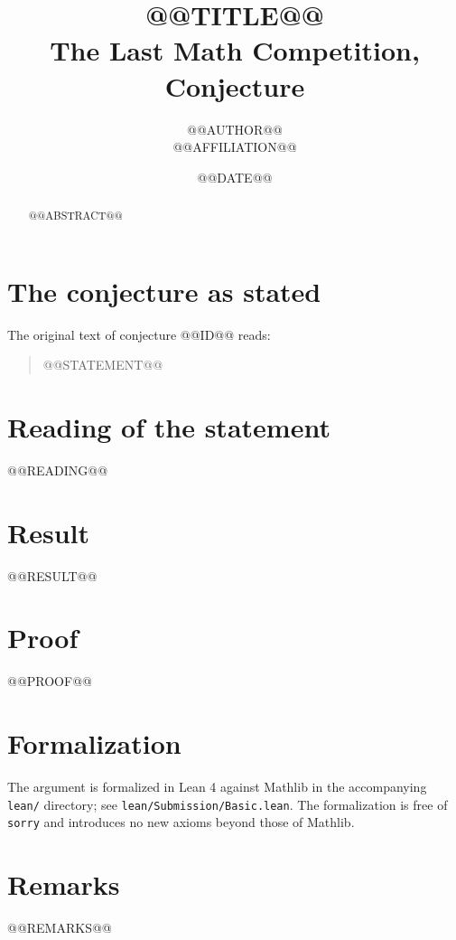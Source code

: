 \documentclass[11pt]{article}
\title{@@TITLE@@\\[0.4em]\large The Last Math Competition, Conjecture \conjid}
\author{@@AUTHOR@@\\ \small @@AFFILIATION@@}
\date{@@DATE@@}
\makeatletter
\theoremstyle{plain}
\theoremstyle{definition}
\theoremstyle{remark}
\newcommand{\conjid}{@@ID@@}
\makeatother
\begin{document}
\maketitle

\begin{abstract}
@@ABSTRACT@@
\end{abstract}

\section{The conjecture as stated}

The original text of conjecture \conjid{} reads:

\begin{quote}
@@STATEMENT@@
\end{quote}

\section{Reading of the statement}


@@READING@@

\section{Result}


@@RESULT@@

\section{Proof}

@@PROOF@@

\section{Formalization}

The argument is formalized in Lean 4 against Mathlib in the accompanying
\texttt{lean/} directory; see \texttt{lean/Submission/Basic.lean}. The
formalization is free of \texttt{sorry} and introduces no new axioms beyond
those of Mathlib.

\section{Remarks}


@@REMARKS@@
\end{document}
